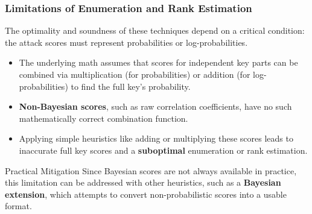 \begin{frame}
    \frametitle{Limitations of Enumeration and Rank Estimation}

    \begin{alertblock}{}
        The optimality and soundness of these techniques depend on a critical condition: the attack scores must represent probabilities or log-probabilities.
    \end{alertblock}

    \begin{itemize}
        \item The underlying math assumes that scores for independent key parts can be combined via multiplication (for probabilities) or addition (for log-probabilities) to find the full key's probability.
        
        \item \textbf{Non-Bayesian scores}, such as raw correlation coefficients, have no such mathematically correct combination function.
        
        \item Applying simple heuristics like adding or multiplying these scores leads to inaccurate full key scores and a \textbf{suboptimal} enumeration or rank estimation.
    \end{itemize}

    \begin{block}{Practical Mitigation}
        Since Bayesian scores are not always available in practice, this limitation can be addressed with other heuristics, such as a \textbf{Bayesian extension}, which attempts to convert non-probabilistic scores into a usable format.
    \end{block}
\end{frame}


